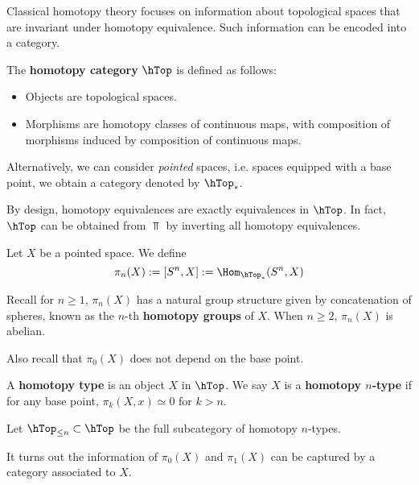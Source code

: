 \ssec{}

Classical homotopy theory focuses on information about topological spaces that are invariant under homotopy equivalence. Such information can be encoded into a category.

\begin{constr}
	The \textbf{homotopy category} $\hTop$ is defined as follows:
	\begin{itemize}
		\item 
			Objects are topological spaces.
		\item
			Morphisms are homotopy classes of continuous maps, with composition of morphisms induced by composition of continuous maps.
	\end{itemize}
\end{constr}

\begin{variant}
	Alternatively, we can consider \emph{pointed} spaces, i.e. spaces equipped with a base point, we obtain a category denoted by $\hTop_*$.
\end{variant}

\ssec{}

By design, homotopy equivalences are exactly equivalences in $\hTop$. In fact, $\hTop$ can be obtained from $\Top$ by inverting all homotopy equivalences.

\begin{defn}
	Let $X$ be a pointed space. We define
	\[
		\pi_n(X):= [S^n,X]:= \Hom_{\hTop_*}(S^n,X) 
	\]
\end{defn}

\ssec{}

Recall for $n\ge 1$, $\pi_n(X)$ has a natural group structure given by concatenation of spheres, known as the $n$-th \textbf{homotopy groups} of $X$. When $n\ge 2$, $\pi_n(X)$ is abelian.

\medskip
Also recall that $\pi_0(X)$ does not depend on the base point.

\begin{defn}
	A \textbf{homotopy type} is an object $X$ in $\hTop$. We say $X$ is a \textbf{homotopy $n$-type} if for any base point, $\pi_k(X,x)\simeq 0$ for $k>n$. 

	\medskip
	Let $\hTop_{\le n} \subset \hTop$ be the full subcategory of homotopy $n$-types.
\end{defn}


\ssec{}

It turns out the information of $\pi_0(X)$ and $\pi_1(X)$ can be captured by a category associated to $X$.

